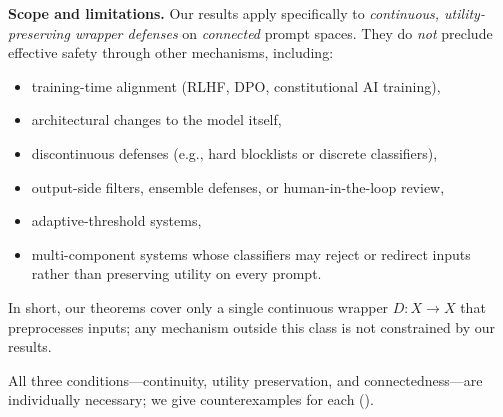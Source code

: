 \documentclass{article}
\begin{document}
\medskip
\noindent\textbf{Scope and limitations.}
Our results apply specifically to \emph{continuous, utility-preserving
wrapper defenses} on \emph{connected} prompt spaces. They do \emph{not}
preclude effective safety through other mechanisms, including:
\begin{itemize}[nosep]
  \item training-time alignment (RLHF, DPO, constitutional AI training),
  \item architectural changes to the model itself,
  \item discontinuous defenses (e.g., hard blocklists or discrete classifiers),
  \item output-side filters, ensemble defenses, or human-in-the-loop review,
  \item adaptive-threshold systems,
  \item multi-component systems whose classifiers may reject or redirect
        inputs rather than preserving utility on every prompt.
\end{itemize}
In short, our theorems cover only a single continuous wrapper
$D\colon X \to X$ that preprocesses inputs; any mechanism outside this
class is not constrained by our results.

All three conditions---continuity, utility preservation, and
connectedness---are individually necessary; we give counterexamples
for each ().
\end{document}
